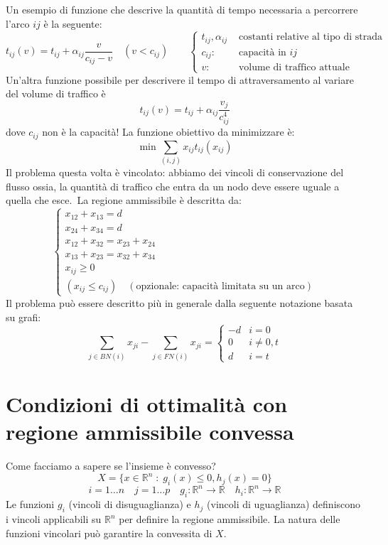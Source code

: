 \begin{example}
Un esempio di funzione che descrive la quantit\`a di tempo necessaria a percorrere
l'arco $ij$ \`e la seguente:
$$
t_{ij}(v) = t_{ij} + \alpha _{ij}  \frac{v}{c_{ij} - v} \quad  (v < c_{ij}) \qquad
\left \{
\begin{array}{ll}
 t_{ij}, \alpha _{ij} & \text{ costanti relative al tipo di strada} \\
 c_{ij}: & \text{ capacit\`a  in } ij \\
 v:  & \text{ volume di traffico attuale} 
\end{array}
\right.
$$
Un'altra funzione possibile per descrivere il tempo di attraversamento al variare del volume 
di traffico \`e 
$$
t_{ij}(v) = t_{ij} + \alpha_{ij} \dfrac{v_j}{c_{ij}^{4}}
$$
dove $c_{ij}$ non \`e la capacit\`a!
La funzione obiettivo da minimizzare \`e:
$$ \min \displaystyle \sum_{(i,j)} x_{ij} t_{ij} (x_{ij}) $$
Il problema questa volta \`e  vincolato:  abbiamo dei vincoli di conservazione del flusso
ossia, la quantit\`a di traffico che entra da un nodo deve essere uguale a quella che esce.\
La regione ammissibile \`e descritta da:
$$
\left\{
\begin{array}{l}
x_{12} + x_{13} = d               \\
x_{24} + x_{34} =d                \\
x_{12} + x_{32} = x_{23} + x_{24} \\
x_{13} + x_{23} = x_{32} + x_{34} \\
x_{ij} \geq 0                     \\
 (x_{ij} \leq c_{ij}) \quad  (\text{opzionale: capacit\`a limitata su un arco})
\end{array}
\right.
$$
Il problema pu\`o essere descritto pi\`u in generale dalla seguente notazione
basata su grafi:
$$
\displaystyle
\sum_{j \in BN(i)} x_{ji}
-
\displaystyle
\sum_{j \in FN(i)} x_{ji}
=
\left\{
\begin{array}{cl}
  -d & i = 0                      \\
  0  & i \neq 0,t                 \\
  d  & i = t
\end{array}
\right.
$$
\end{example}

\section{Condizioni di ottimalit\`a con regione ammissibile convessa}
Come facciamo a sapere se l'insieme \`e convesso?
$$ X = \{ x \in \mathbb{R}^{n} \; : \; g_{i}(x) \leq 0, h_j(x)=0 \} $$
$$
i=1\ldots n \quad j=1\ldots p
\quad
g_i : \mathbb{R}^{n} \rightarrow \mathbb{R}
\quad
h_i : \mathbb{R}^{n} \rightarrow \mathbb{R}
$$
Le funzioni $g_i$ (vincoli di disuguaglianza) e $h_j$ (vincoli di
uguaglianza) definiscono i vincoli applicabili su $\mathbb{R}^n$ per
definire la regione ammissibile.
La natura delle funzioni vincolari pu\`o garantire la convessita di $X$.

